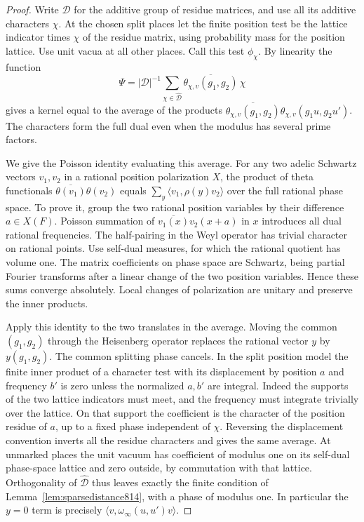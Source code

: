 \documentclass[a4paper,11pt]{article}
\theoremstyle{definition}
\theoremstyle{remark}
\numberwithin{equation}{section}
\begin{document}
\begin{proof}
Write \(\mathcal D\) for the additive group of residue
matrices, and use all its additive characters \(\chi\).
At the chosen split places let the finite position test be
the lattice indicator times \(\chi\) of the residue
matrix, using probability mass for the position lattice.
Use unit vacua at all other places. Call this test \(\phi_\chi\).
By linearity the function
\[
 \Psi=|\mathcal D|^{-1}\sum_{\chi\in\widehat{\mathcal D}}
             \overline{\theta_{\chi,v}(g_1,g_2)}\,\chi
\]
gives a kernel equal to the average of the products
\(\overline{\theta_{\chi,v}(g_1,g_2)}
                    \theta_{\chi,v}(g_1u,g_2u')\).
The characters form the full dual even when the modulus has
several prime factors.

We give the Poisson identity evaluating this average.
For any two adelic Schwartz vectors \(v_1,v_2\) in a rational
position polarization \(X\), the product of theta functionals
\(\overline{\theta(v_1)}\theta(v_2)\) equals
\(\sum_{y}\langle v_1,\rho(y)v_2\rangle\) over the full
rational phase space. To prove it, group the two rational
position variables by their difference \(a\in X(F)\).
Poisson summation of
\(\overline{v_1(x)}v_2(x+a)\) in \(x\) introduces all
dual rational frequencies. The half-pairing in the Weyl
operator has trivial character on rational points. Use
self-dual measures, for which the rational quotient has
volume one. The matrix coefficients on phase space are
Schwartz, being partial Fourier transforms after a linear
change of the two position variables. Hence these sums
converge absolutely. Local changes of polarization are
unitary and preserve the inner products.

Apply this identity to the two translates in the average.
Moving the common \((g_1,g_2)\) through the Heisenberg
operator replaces the rational vector \(y\) by
\(y(g_1,g_2)\). The common splitting phase cancels. In the
split position model the finite inner product of a character
test with its displacement by position \(a\) and frequency
\(b'\) is zero unless the normalized \(a,b'\) are integral.
Indeed the supports of the two lattice indicators must
meet, and the frequency must integrate trivially over the
lattice. On that support the coefficient is the character
of the position residue of \(a\), up to a fixed phase
independent of \(\chi\). Reversing the displacement convention
inverts all the residue characters and gives the same
average. At unmarked places the unit vacuum has coefficient
of modulus one on its self-dual phase-space lattice and
zero outside, by commutation with that lattice.
Orthogonality of \(\widehat{\mathcal D}\) thus leaves
exactly the finite condition of Lemma~\ref{lem:sparsedistance814},
with a phase of modulus one. In particular the \(y=0\)
term is precisely \(\langle v,\omega_\infty(u,u')v\rangle\).


\end{proof}
\end{document}
